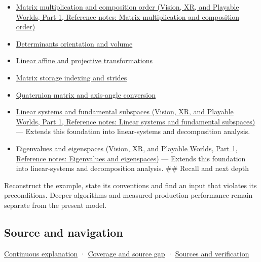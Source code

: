 \hypertarget{appendix-bd39c3bf5d64-used-by}{}

\begin{itemize}
\tightlist
\item
  \href{../07-Vision-XR-and-Playable-Worlds-P01/main.pdf\#nameddest=appendix-ab31ef447dbf}{Matrix multiplication and composition order (Vision, XR, and Playable Worlds, Part 1, Reference notes: Matrix multiplication and composition order)}
\item
  \hyperref[appendix-da478be01d02]{Determinants orientation and volume}
\item
  \hyperref[appendix-0bf0ca73f735]{Linear affine and projective transformations}
\item
  \hyperref[appendix-ffdc1d4e5350]{Matrix storage indexing and strides}
\item
  \hyperref[appendix-26d8da71f6c4]{Quaternion matrix and axis-angle conversion}
\item
  \href{../07-Vision-XR-and-Playable-Worlds-P01/main.pdf\#nameddest=appendix-8572a4a060c1}{Linear systems and fundamental subspaces (Vision, XR, and Playable Worlds, Part 1, Reference notes: Linear systems and fundamental subspaces)} --- Extends this foundation into linear-systems and decomposition analysis.
\item
  \href{../07-Vision-XR-and-Playable-Worlds-P01/main.pdf\#nameddest=appendix-0b3be18411f9}{Eigenvalues and eigenspaces (Vision, XR, and Playable Worlds, Part 1, Reference notes: Eigenvalues and eigenspaces)} --- Extends this foundation into linear-systems and decomposition analysis. \#\# Recall and next depth
\end{itemize}

Reconstruct the example, state its conventions and find an input that violates its preconditions. Deeper algorithms and measured production performance remain separate from the present model.

\subsection{Source and navigation}\label{appendix-bd39c3bf5d64-source-and-navigation}

\hypertarget{appendix-bd39c3bf5d64-source-and-navigation}{}

\hyperref[01-foundations-i-ch018-keep-the-promises-visible-while-moving-between-representations]{Continuous explanation} · \hyperref[appendix-fd090d982a15-phase-7---parts-601-700]{Coverage and source gap} · \hyperref[appendix-a103e7846d21-phase-7---source-analysis-and-verification]{Sources and verification}
